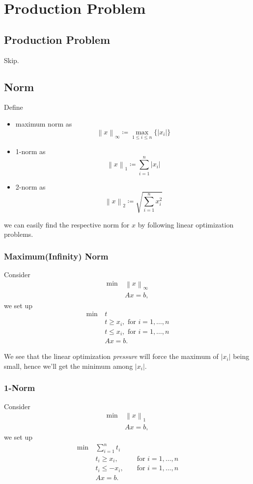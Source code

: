 \chapter{Production Problem}
\section{Production Problem}
Skip.
\section{Norm}
Define
\begin{itemize}
	\item maximum norm as
	      \[
		      \left\lVert x\right\rVert_{\infty } \coloneqq \max_{1\leq i \leq n}\{\left\vert x_i \right\vert \}
	      \]
	\item 1-norm as
	      \[
		      \left\lVert x\right\rVert_{1} \coloneqq \sum\limits_{i=1}^{n} \left\vert x_i \right\vert
	      \]
	\item 2-norm as
	      \[
		      \left\lVert x\right\rVert_{2} \coloneqq \sqrt{\sum\limits_{i=1}^{n} x_i^2}
	      \]
\end{itemize}
we can easily find the respective norm for \(x\) by following linear optimization problems.

\subsection{Maximum(Infinity) Norm}
Consider
\begin{align*}
	\min~ & \left\lVert x\right\rVert_{\infty } \\
	      & Ax = b,
\end{align*}
we set up
\begin{align*}
	\min~ & t                                      \\
	      & t\geq x_i,\text{ for }i = 1, \ldots ,n \\
	      & t\leq x_i,\text{ for }i = 1, \ldots ,n \\
	      & Ax = b.
\end{align*}

We see that the linear optimization \emph{pressure} will force the maximum of \(\left\vert x_i \right\vert \) being small, hence
we'll get the minimum among \(\left\vert x_i \right\vert \).

\subsection{1-Norm}
Consider
\begin{align*}
	\min~ & \left\lVert x\right\rVert_1 \\
	      & Ax = b,
\end{align*}
we set up
\[
	\begin{alignedat}{3}
		\min~ & \sum\limits_{i=1}^{n} t_i                \\
		& t_i\geq x_i, && \text{ for }i = 1, \ldots ,n  \\
		& t_i\leq -x_i, && \text{ for }i = 1, \ldots ,n \\
		& Ax = b.
	\end{alignedat}
\]

